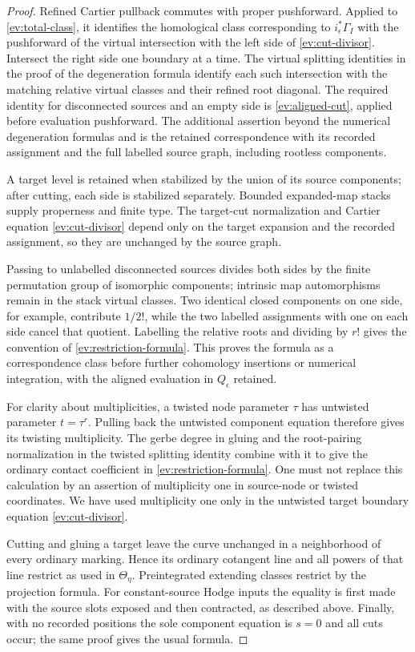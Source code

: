 \begin{proof}
Refined Cartier pullback commutes with proper pushforward.  Applied
to \eqref{ev:total-class}, it identifies the homological class
corresponding to $i_\epsilon^*\Gamma_I$ with the pushforward of the
virtual intersection with the left side of
\eqref{ev:cut-divisor}.  Intersect the right side one boundary at a
time.  The virtual splitting identities in the proof of the
degeneration formula identify each such intersection with the
matching relative virtual classes and their refined root diagonal.
The required identity for disconnected sources and an empty side is
\cref{ev:aligned-cut}, applied before evaluation pushforward.  The
additional assertion beyond the numerical degeneration formulas
\cite[Sections~5.3--5.9]{AF2016} and \cite[Theorem~2.3]{ABPZ} is the
retained correspondence with its recorded assignment and the full
labelled source graph, including rootless components.

A target level is retained when stabilized by the union of its
source components; after cutting, each side is stabilized separately.
Bounded expanded-map stacks supply properness and finite type.  The
target-cut normalization and Cartier equation
\eqref{ev:cut-divisor} depend only on the target expansion and the
recorded assignment, so they are unchanged by the source graph.

Passing to unlabelled disconnected sources divides both sides by the
finite permutation group of isomorphic components; intrinsic map
automorphisms remain in the stack virtual classes.  Two identical
closed components on one side, for example, contribute $1/2!$,
while the two labelled assignments with one on each side cancel
that quotient.  Labelling the relative roots and dividing by $r!$
gives the convention of \eqref{ev:restriction-formula}.  This proves
the formula as a correspondence class before further cohomology
insertions or numerical integration, with the aligned evaluation in
$Q_\epsilon$ retained.

For clarity about multiplicities, a twisted node parameter $\tau$
has untwisted parameter $t=\tau^r$.  Pulling back the untwisted
component equation therefore gives its twisting multiplicity.
The gerbe degree in gluing and the root-pairing normalization in the
twisted splitting identity combine with it to give the ordinary
contact coefficient in \eqref{ev:restriction-formula}.  One must
not replace this calculation by an assertion of multiplicity one
in source-node or twisted coordinates.  We have used multiplicity
one only in the untwisted target boundary equation
\eqref{ev:cut-divisor}.

Cutting and gluing a target leave the curve unchanged in a
neighborhood of every ordinary marking.  Hence its ordinary
cotangent line and all powers of that line restrict as used in
$\Theta_\eta$.  Preintegrated extending classes restrict by the
projection formula.  For constant-source Hodge inputs the equality
is first made with the source slots exposed and then contracted,
as described above.  Finally, with no recorded positions the sole
component equation is $s=0$ and all cuts occur; the same proof gives
the usual formula.
\end{proof}

